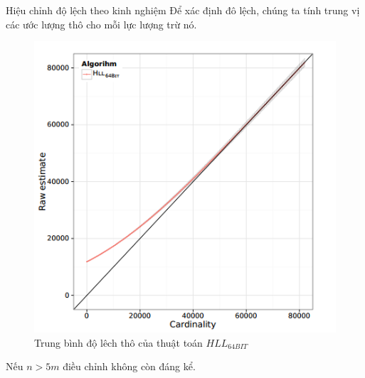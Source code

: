 \documentclass{beamer}
\begin{document}
\begin{frame}{Hiệu chỉnh độ lệch theo kinh nghiệm}
Để xác định đô lệch, chúng ta tính trung vị các ước lượng thô cho mỗi lực lượng trừ nó.
\begin{figure}[h]
\includegraphics[scale=0.45]{img1.png}
\caption{Trung bình độ lêch thô của thuật toán $HLL_{64BIT}$}
\end{figure}
Nếu  $n > 5m$ điều chỉnh không còn đáng kể.
\end{frame}
\end{document}
